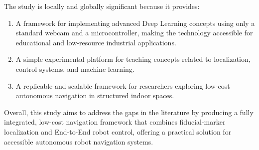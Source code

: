 The study is locally and globally significant because it provides:

\begin{enumerate}
    \item A framework for implementing advanced Deep Learning concepts using only a standard webcam and a microcontroller, making the technology accessible for educational and low-resource industrial applications.
    \item A simple experimental platform for teaching concepts related to localization, control systems, and machine learning.
    \item A replicable and scalable framework for researchers exploring low-cost autonomous navigation in structured indoor spaces.
\end{enumerate}

Overall, this study aims to address the gaps in the literature by producing a fully integrated, low-cost navigation framework that combines fiducial-marker localization and End-to-End robot control, offering a practical solution for accessible autonomous robot navigation systems.


